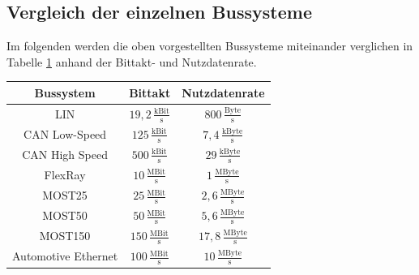 \subsection{Vergleich der einzelnen Bussysteme}
Im folgenden werden die oben vorgestellten Bussysteme miteinander verglichen in Tabelle \ref{tab:Bussysteme} anhand der Bittakt- und Nutzdatenrate.
\begin{table}[hbt]	
	\centering
	\renewcommand{\arraystretch}{1.5}	%
	\label{tab:Bussysteme}
	\begin{tabular}{c|cc}
		 \parbox[t]{0.2\linewidth}{\centering Bussystem} & \parbox[t]{0.2\linewidth}{\centering Bittakt} & \parbox[t]{0.2\linewidth}{\centering Nutzdatenrate}  \\ 
		\hline 
		\hline
		LIN & $ 19,2\,\frac{\mathrm{kBit}}{\mathrm{s}} $ & $ 800\,\frac{\mathrm{Byte}}{\mathrm{s}} $  \\
		CAN Low-Speed & $ 125\,\frac{\mathrm{kBit}}{\mathrm{s}} $ & $ 7,4\,\frac{\mathrm{kByte}}{\mathrm{s}} $ \\
		CAN High Speed & $ 500\,\frac{\mathrm{kBit}}{\mathrm{s}} $ & $ 29\,\frac{\mathrm{kByte}}{\mathrm{s}} $  \\
		FlexRay & $ 10\,\frac{\mathrm{MBit}}{\mathrm{s}} $ & $ 1 \,\frac{\mathrm{MByte}}{\mathrm{s}} $  \\
		MOST25 & $ 25\,\frac{\mathrm{MBit}}{\mathrm{s}} $ & $ 2,6\,\frac{\mathrm{MByte}}{\mathrm{s}} $  \\
		MOST50 & $ 50\,\frac{\mathrm{MBit}}{\mathrm{s}} $ & $ 5,6\,\frac{\mathrm{MByte}}{\mathrm{s}} $  \\
		MOST150 & $ 150\,\frac{\mathrm{MBit}}{\mathrm{s}} $ & $ 17,8\,\frac{\mathrm{MByte}}{\mathrm{s}} $  \\
		Automotive Ethernet & $ 100\,\frac{\mathrm{MBit}}{\mathrm{s}} $ & $ 10\,\frac{\mathrm{MByte}}{\mathrm{s}} $  \\
	\end{tabular} 
\end{table}